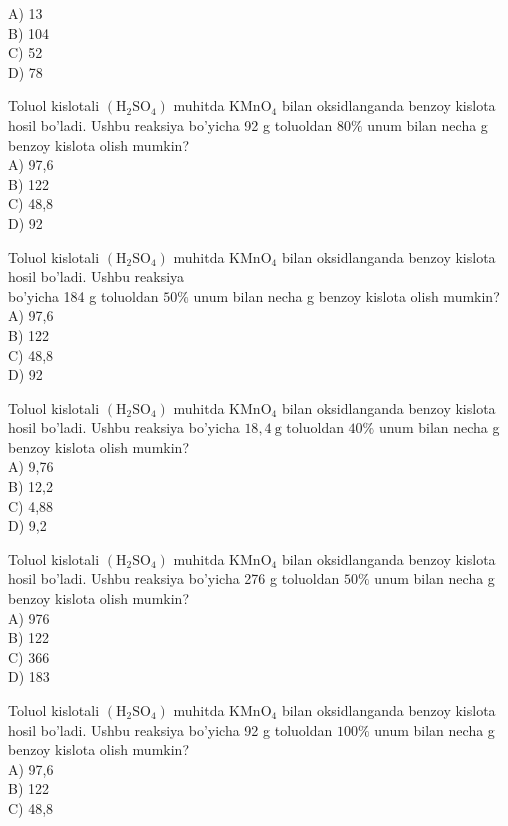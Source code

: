 A) 13\\
B) 104\\
C) 52\\
D) 78
  \item Toluol kislotali $\left(\mathrm{H}_{2} \mathrm{SO}_{4}\right)$ muhitda $\mathrm{KMnO}_{4}$ bilan oksidlanganda benzoy kislota hosil bo'ladi. Ushbu reaksiya bo'yicha 92 g toluoldan $80 \%$ unum bilan necha g benzoy kislota olish mumkin?\\
A) 97,6\\
B) 122\\
C) 48,8\\
D) 92
  \item Toluol kislotali $\left(\mathrm{H}_{2} \mathrm{SO}_{4}\right)$ muhitda $\mathrm{KMnO}_{4}$ bilan oksidlanganda benzoy kislota hosil bo'ladi. Ushbu reaksiya\\
bo'yicha 184 g toluoldan $50 \%$ unum bilan necha g benzoy kislota olish mumkin?\\
A) 97,6\\
B) 122\\
C) 48,8\\
D) 92
  \item Toluol kislotali $\left(\mathrm{H}_{2} \mathrm{SO}_{4}\right)$ muhitda $\mathrm{KMnO}_{4}$ bilan oksidlanganda benzoy kislota hosil bo'ladi. Ushbu reaksiya bo'yicha $18,4 \mathrm{~g}$ toluoldan $40 \%$ unum bilan necha g benzoy kislota olish mumkin?\\
A) 9,76\\
B) 12,2\\
C) 4,88\\
D) 9,2
  \item Toluol kislotali $\left(\mathrm{H}_{2} \mathrm{SO}_{4}\right)$ muhitda $\mathrm{KMnO}_{4}$ bilan oksidlanganda benzoy kislota hosil bo'ladi. Ushbu reaksiya bo'yicha 276 g toluoldan $50 \%$ unum bilan necha g benzoy kislota olish mumkin?\\
A) 976\\
B) 122\\
C) 366\\
D) 183
  \item Toluol kislotali $\left(\mathrm{H}_{2} \mathrm{SO}_{4}\right)$ muhitda $\mathrm{KMnO}_{4}$ bilan oksidlanganda benzoy kislota hosil bo'ladi. Ushbu reaksiya bo'yicha 92 g toluoldan $100 \%$ unum bilan necha g benzoy kislota olish mumkin?\\
A) 97,6\\
B) 122\\
C) 48,8\\
